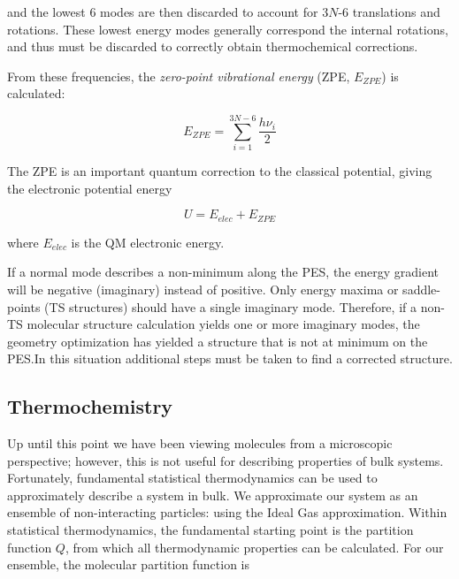 \begin{doublespace}
\noindent and the lowest 6 modes are then discarded to account for 3$N$-6
translations and rotations. These lowest energy modes generally correspond the
internal rotations, and thus must be discarded to correctly obtain
thermochemical corrections.

From these frequencies, the \emph{zero-point vibrational energy} (ZPE,
$E_{ZPE}$) is calculated:

\begin{equation}
  E_{ZPE} = \sum_{i=1}^{3N-6} \frac{h\nu_i}{2}
\end{equation}

\noindent The ZPE is an important quantum correction to the classical
potential, giving the electronic potential energy

\begin{equation}
U = E_{elec} + E_{ZPE}
\end{equation}

\noindent where $E_{elec}$ is the QM electronic energy.

If a normal mode describes a non-minimum along the PES, the energy gradient
will be negative (imaginary) instead of positive. Only energy maxima or
saddle-points (TS structures) should have a single imaginary mode. Therefore,
if a non-TS molecular structure calculation yields one or more imaginary modes,
the geometry optimization has yielded a structure that is not at minimum on
the PES.\@ In this situation additional steps must be taken to find a corrected
structure.

\subsection{Thermochemistry}

Up until this point we have been viewing molecules from a microscopic
perspective; however, this is not useful for describing properties of bulk
systems. Fortunately, fundamental statistical thermodynamics can be used to
approximately describe a system in bulk.\cite{McQuarrie1999,McQuarrie2000} We
approximate our system as an ensemble of non-interacting particles: using the
Ideal Gas approximation. Within statistical thermodynamics, the fundamental
starting point is the partition function $Q$, from which
all thermodynamic properties can be calculated. For our ensemble, the molecular
partition function is


\end{doublespace}

